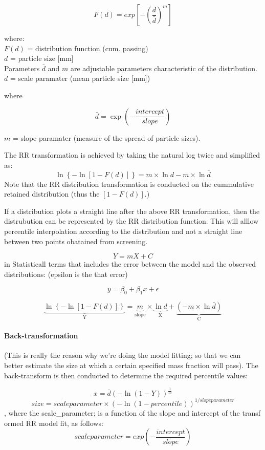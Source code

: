 \documentclass[
]{article}
\begin{document}
\[  F\left(d\right) = exp\left[-(\frac{d}{\bar{d}})^{m} \right] \]

where:\\
\(F(d)\) = distribution function (cum. passing)\\
\(d\) = particle size {[}mm{]}\\
Parameters \(\bar{d}\) and \(m\) are adjustable parameters
characteristic of the distribution.\\
\(\bar{d}\) = scale paramater (mean particle size {[}mm{]})

where

\[\bar{d} = \exp\left({-\frac{intercept}{slope}}\right) \]

\(m\) = slope paramater (measure of the spread of particle sizes).

The RR transformation is achieved by taking the natural log twice and
simplified as:
\[\ln\left\{-\ln\left[1-F(d)\right] \right\} = m\times \ln d - m\times \ln \bar{d} \]
Note that the RR distribution transformation is conducted on the
cummulative retained distribution (thus the \(\left[1-F(d)\right]\).)

If a distribution plots a straight line after the above RR
transformation, then the distrubution can be represented by the RR
distribution function. This will alllow percentile interpolation
according to the distribution and not a straight line between two points
obatained from screening.

\[ Y=mX + C\] in Statisticall terms that includes the error between the
model and the observed distributions: (epsilon is the that error)

\[y=\beta_0+\beta_1x+\epsilon\]

\[\underbrace{\ln\left\{-\ln\left[1-F(d)\right] \right\}}_\textrm{Y} =  \underbrace{m}_\textrm{slope}\times \underbrace{\ln d}_\textrm{X}+\underbrace{ \left(-m\times \ln \bar{d}\right)}_\textrm{C} \]

\hypertarget{back-transformation}{%
\paragraph{Back-transformation}\label{back-transformation}}

(This is really the reason why we're doing the model fitting; so that we
can better estimate the size at which a certain specified mass fraction
will pass). The back-transform is then conducted to determine the
required percentile values:

\[ x = \bar{d} \left(- \ln \left(1-Y \right)\right)^\frac{1}{m}\]
\[size = scale parameter\times (-\ln (1-percentile))^{1/slope parameter}\]
, where the scale\_parameter; is a function of the slope and intercept
of the transf ormed RR model fit, as follows:
\[scale parameter = exp(-\frac{intercept}{slope} )\]
\end{document}
